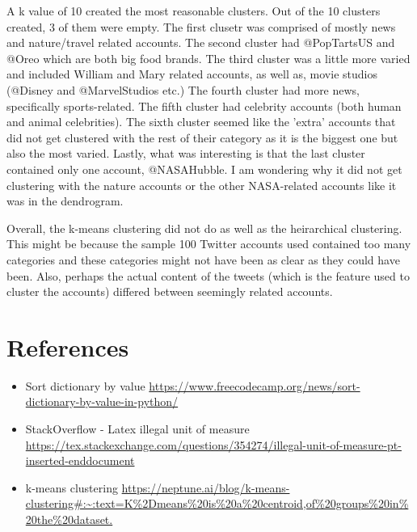 \documentclass[12pt]{article}
\begin{document}
A k value of 10 created the most reasonable clusters. Out of the 10 clusters created, 3 of them were empty. The first clusetr was comprised of mostly news and nature/travel related accounts. The second cluster had @PopTartsUS and @Oreo which are both big food brands. The third cluster was a little more varied and included William and Mary related accounts, as well as, movie studios (@Disney and @MarvelStudios etc.) The fourth cluster had more news, specifically sports-related. The fifth cluster had celebrity accounts (both human and animal celebrities). The sixth cluster seemed like the 'extra' accounts that did not get clustered with the rest of their category as it is the biggest one but also the most varied. Lastly, what was interesting is that the last cluster contained only one account, @NASAHubble. I am wondering why it did not get clustering with the nature accounts or the other NASA-related accounts like it was in the dendrogram. 

Overall, the k-means clustering did not do as well as the heirarchical clustering. This might be because the sample 100 Twitter accounts used contained too many categories and these categories might not have been as clear as they could have been. Also, perhaps the actual content of the tweets (which is the feature used to cluster the accounts) differed between seemingly related accounts.

\section*{References}

\begin{itemize}
    \item{Sort dictionary by value} \url{https://www.freecodecamp.org/news/sort-dictionary-by-value-in-python/}
    \item{StackOverflow - Latex illegal unit of measure}
    \url{https://tex.stackexchange.com/questions/354274/illegal-unit-of-measure-pt-inserted-enddocument}
    \item{k-means clustering}
    \url{https://neptune.ai/blog/k-means-clustering#:~:text=K%2Dmeans%20is%20a%20centroid,of%20groups%20in%20the%20dataset.}
\end{itemize}
\end{document}
